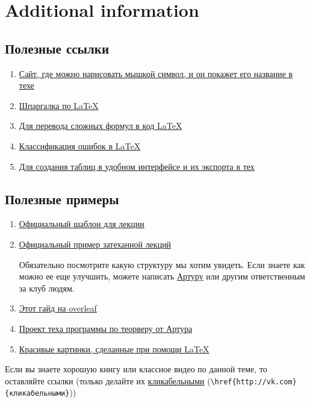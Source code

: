 \newpage
\section{Additional information}
\subsection{Полезные ссылки}
\begin{enumerate}
	\item \href{http://detexify.kirelabs.org/classify.html}{Сайт, где можно нарисовать мышкой символ, и он покажет его название в техе}
	\item \href{http://wch.github.io/latexsheet/latexsheet.pdf}{Шпаргалка по \LaTeX}
	\item \href{https://mathpix.com}{Для перевода сложных формул в код \LaTeX}
	\item \href{https://www.cs.utexas.edu/~witchel/projects/clarify_errorclasses.html}{Классификация ошибок в LaTeX}
	\item \href{https://www.tablesgenerator.com}{Для создания таблиц в удобном интерфейсе и их экспорта в тех}
\end{enumerate}
\subsection{Полезные примеры} 
\begin{enumerate}
	\item  \href{https://www.overleaf.com/read/ztcjscdmtprq}{Официальный шаблон для лекции}
	\item  \href{https://www.overleaf.com/read/vjgrqfzydcyq}{Официальный пример затеханной лекций}
	
	Обязательно посмотрите какую структуру мы хотим увидеть.
	Если знаете как можно ее еще улучшить, можете написать \href{https://vk.com/kulart00}{Артуру} или другим ответственным за клуб людям.
	
	\item  \href{https://www.overleaf.com/read/hgdqksrpzrbt}{Этот гайд на overleaf}
	
	\item \href{https://www.overleaf.com/read/yryyfnmhyndd}{Проект теха программы по теорверу от Артура}
	
	\item \href{https://tex.stackexchange.com/questions/158668/nice-scientific-pictures-show-off}{ Красивые картинки, сделанные при помощи \LaTeX}
\end{enumerate}
Если вы знаете хорошую книгу или классное видео по данной теме, то оставляйте ссылки (только делайте их \href{http://vk.com}{кликабельными} (\verb|\href{http://vk.com}{кликабельными}|))

